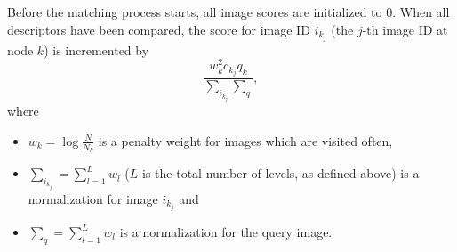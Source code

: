 Before the matching process starts, all image scores are initialized to 0. When all descriptors have been compared, the score for image ID $i_{k_j}$ (the $j$-th image ID at node $k$) is incremented by 
\begin{equation}
\frac{w_k^2 c_{k_j} q_k}{\sum_{i_{k_j}} \sum_q},
\end{equation}
where
\begin{itemize}
\item $w_k = \log \frac{N}{N_k}$ is a penalty weight for images which are visited often,
\item $\sum_{i_{k_j}} = \sum_{l=1}^L w_l$ ($L$ is the total number of levels, as defined above) is a normalization for image $i_{k_j}$ and
\item $\sum_q = \sum_{l=1}^L w_l$ is a normalization for the query image.
\end{itemize}

